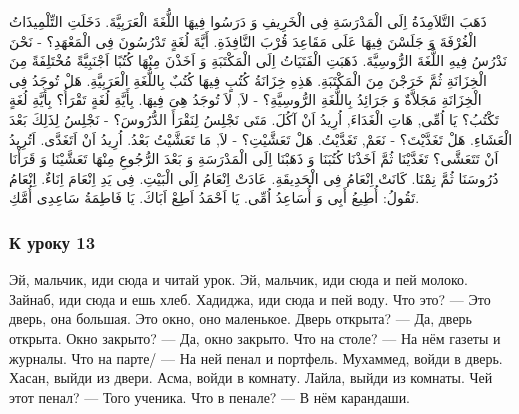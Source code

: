 \documentclass[a5paper]{article}
\begin{document}
ذَهَبَ التَّلاَمِذَةُ اِلَى الْمَدْرَسَةِ فِى الْخَرِيفِ وَ دَرَسُوا فِيهَا اللُّغَةَ الْعَرَبِيَّةَ. دَخَلَتِ التِّلْمِيذَاتُ الْغُرْفَةَ وَ جَلَسْنَ فِيهَا عَلَى مَقَاعِدَ قُرْبَ النَّافِذَةِ. أَيَّةَ لُغَةٍ تَدْرُسُونَ فِى الْمَعْهَدِ؟ - نَحْنَ نَدْرُسُ فِيهِ اللُّغَةَ الرُّوسِيَّةَ. ذَهَبَتِ الْفَتَيَاتُ اِلَى الْمَكْتَبَةِ وَ اَخَذْنَ مِنْهَا كُتُبًا اَجْنَبِيَّةً مُخْتَلِفَةً مِنَ الْخِزَانَةِ ثُمَّ خَرَجْنَ مِنَ الْمَكْتَبَةِ. هَذِهِ خِزَانَةُ كُتُبٍ فِيهَا كُتُبٌ بِاللُّغَةِ الْعَرَبِيَّةِ. هَلْ تُوجَدُ فِى الْخِزَانَةِ مَجَلاَّةٌ وَ جَرَائِدُ بِاللُّغَةِ الرُّوسِيَّةِ؟ - لاَ, لاَ تُوجَدُ هِىَ فِيهَا. بِأَيَّةِ لُغَةٍ تَقْرَأُ؟ بِأَيَّةِ لُغَةٍ تَكْتُبُ؟ يَا اُمِّى, هَاتِ الْغَدَاءَ, اُرِيدُ اَنْ آكُلَ. مَتَى نَجْلِسُ لِنَقْرَأَ الدُّرُوسَ؟ - نَجْلِسُ لِذَلِكَ بَعْدَ الْعَشَاءِ. هَلْ تَغَدَّيْتَ؟ - نَعَمْ, تَغَدَّيْتُ. هَلْ تَعَشَّيْتِ؟ - لاَ, مَا تَعَشَّيْتُ بَعْدُ. اُرِيدُ اَنْ اَتَغَدَّى. اَتُرِيدُ اَنْ تَتَعَشَّى؟ تَغَدَّيْنَا ثُمَّ اَخَذْنَا كُتُبَنَا وَ ذَهَبْنَا اِلَى الْمَدْرَسَةِ وَ بَعْدَ الرُّجُوعِ مِنْهَا تَعَشَّيْنَا وَ قَرَأْنَا دُرُوسَنَا ثُمَّ نِمْنَا. كَانَتْ اِنْعَامُ فِى الْحَدِيقَةِ. عَادَتْ اِنْعَامُ اِلَى الْبَيْتِ. فِى يَدِ اِنْعَامَ اِنَاءٌ. اِنْعَامُ تَقُولُ: أُطِيعُ أَبِى وَ أُسَاعِدُ اُمِّى. يَا اَحْمَدُ اَطِعْ اَبَاكَ. يَا فَاطِمَةُ سَاعِدِى أُمَّكِ. 

\subsubsection{К уроку 13}
Эй, мальчик, иди сюда и читай урок. Эй, мальчик, иди сюда и пей молоко. Зайнаб, иди сюда и ешь хлеб. Хадиджа, иди сюда и пей воду. Что это? — Это дверь, она большая. Это окно, оно маленькое. Дверь открыта? — Да, дверь открыта. Окно закрыто? — Да, окно закрыто. Что на столе? — На нём газеты и журналы. Что на парте/ — На ней пенал и портфель. Мухаммед, войди в дверь. Хасан, выйди из двери. Асма, войди в комнату. Лайла, выйди из комнаты. Чей этот пенал? — Того ученика. Что в пенале? — В нём карандаши.
\end{document}
